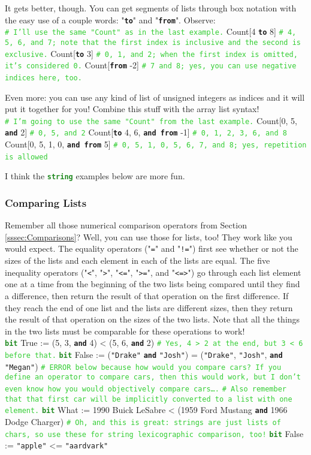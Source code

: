 \documentclass{article}
\newcommand{\sssecl}[1]{\subsubsection{#1}\label{sssec:#1}}
\newcommand{\codecomment}[1]{\texttt{\textcolor{LimeGreen}{#1}}}
\newcommand{\commentline}[1]{\codecomment{\# #1}}
\newcommand{\type}[1]{\texttt{\textcolor{ForestGreen}{\textbf{#1}}}}
\newcommand{\common}[1]{\texttt{\textcolor{Mulberry}{\textbf{#1}}}}
\newcommand{\codestring}[1]{\texttt{\textcolor{NavyBlue}{"#1"}}}
\newenvironment{code}[0]
{\ttfamily{}				%
\setlength\parindent{0cm}	%
~\\}
{\setlength\parindent{1cm}
~\\}
\begin{document}
\indent It gets better, though. You can get segments of lists through box notation with the easy use of a couple words: "\common{to}" and "\common{from}". Observe:
\begin{code}
\commentline{I'll use the same "Count" as in the last example.}
Count[4 \common{to} 8] \commentline{4, 5, 6, and 7; note that the first index is inclusive and the second is exclusive.}
Count[\common{to} 3] \commentline{0, 1, and 2; when the first index is omitted, it's considered 0.}
Count[\common{from} -2] \commentline{7 and 8; yes, you can use negative indices here, too.}
\end{code}

\indent Even more: you can use any kind of list of unsigned integers as indices and it will put it together for you! Combine this stuff with the array list syntax!
\begin{code}
\commentline{I'm going to use the same "Count" from the last example.}
Count[0, 5, \common{and} 2] \commentline{0, 5, and 2}
Count[\common{to} 4, 6, \common{and from} -1] \commentline{0, 1, 2, 3, 6, and 8}
Count[0, 5, 1, 0, \common{and from} 5] \commentline{0, 5, 1, 0, 5, 6, 7, and 8; yes, repetition is allowed}
\end{code}

\indent I think the \type{string} examples below are more fun.

\sssecl{Comparing Lists}
\indent Remember all those numerical comparison operators from Section \ref{sssec:Comparisons}? Well, you can use those for lists, too! They work like you would expect.
\indent The equality operators ("\texttt{=}" and "\texttt{!=}") first see whether or not the sizes of the lists and each element in each of the lists are equal.
\indent The five inequality operators ("\texttt{<}", "\texttt{>}", "\texttt{<=}", "\texttt{>=}", and "\texttt{<=>}") go through each list element one at a time from the beginning of the two lists being compared until they find a difference, then return the result of that operation on the first difference. If they reach the end of one list and the lists are different sizes, then they return the result of that operation on the sizes of the two lists. Note that all the things in the two lists must be comparable for these operations to work!
\begin{code}
\type{bit} True := (5, 3, \common{and} 4) < (5, 6, \common{and} 2) \commentline{Yes, 4 > 2 at the end, but 3 < 6 before that.}
\type{bit} False := (\codestring{Drake} \common{and} \codestring{Josh}) = (\codestring{Drake}, \codestring{Josh}, \common{and} \codestring{Megan})
\commentline{ERROR below because how would you compare cars? If you define an operator to compare cars, then this would work, but I don't even know how you would objectively compare cars\ldots{}.}
\commentline{Also remember that that first car will be implicitly converted to a list with one element.}
\type{bit} What := 1990 Buick LeSabre < (1959 Ford Mustang \common{and} 1966 Dodge Charger)
\commentline{Oh, and this is great: strings are just lists of chars, so use these for string lexicographic comparison, too!}
\type{bit} False := \codestring{apple} <= \codestring{aardvark}
\end{code}
\end{document}
